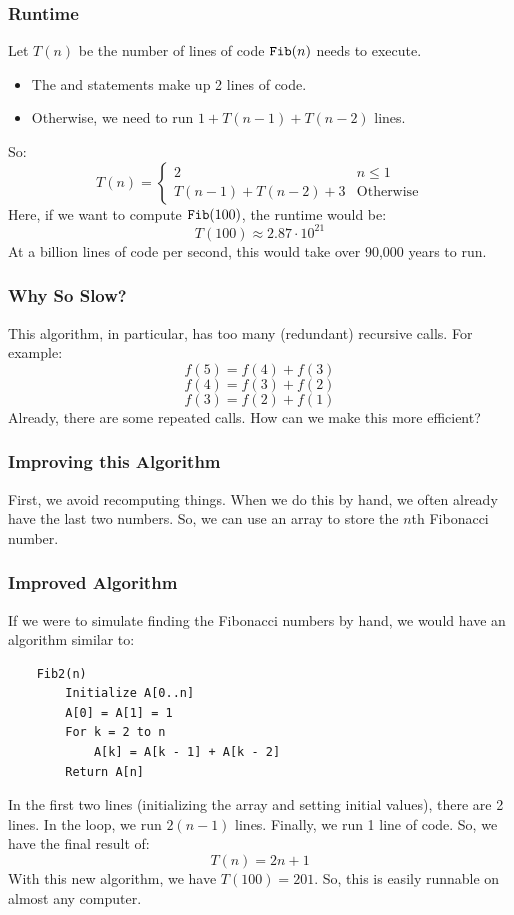 \documentclass[letterpaper]{article}
\begin{document}
\subsubsection{Runtime}
Let $T(n)$ be the number of lines of code $\texttt{Fib}(n)$ needs to execute.
\begin{itemize}
    \item The  and  statements make up 2 lines of code. 
    \item Otherwise, we need to run $1 + T(n - 1) + T(n - 2)$ lines.
\end{itemize}
So: 
\[T(n) = \begin{cases}
    2 & n \leq 1 \\ 
    T(n - 1) + T(n - 2) + 3 & \text{Otherwise}
\end{cases}\]
Here, if we want to compute $\texttt{Fib}(100)$, the runtime would be: 
\[T(100) \approx 2.87 \cdot 10^{21}\]
At a billion lines of code per second, this would take over 90,000 years to run. 

\subsubsection{Why So Slow?}
This algorithm, in particular, has too many (redundant) recursive calls. For example:
\[f(5) = f(4) + f(3)\]
\[f(4) = f(3) + f(2)\]
\[f(3) = f(2) + f(1)\]
Already, there are some repeated calls. How can we make this more efficient? 

\subsubsection{Improving this Algorithm}
First, we avoid recomputing things. When we do this by hand, we often already have the last two numbers. So, we can use an array to store the $n$th Fibonacci number. 

\subsubsection{Improved Algorithm}
If we were to simulate finding the Fibonacci numbers by hand, we would have an algorithm similar to:
\begin{verbatim}
    Fib2(n)
        Initialize A[0..n]
        A[0] = A[1] = 1
        For k = 2 to n
            A[k] = A[k - 1] + A[k - 2]
        Return A[n]
\end{verbatim}
In the first two lines (initializing the array and setting initial values), there are 2 lines. In the  loop, we run $2(n - 1)$ lines. Finally, we run 1 line of code. So, we have the final result of: 
\[T(n) = 2n + 1\]
With this new algorithm, we have $T(100) = 201$. So, this is easily runnable on almost any computer.
\end{document}
